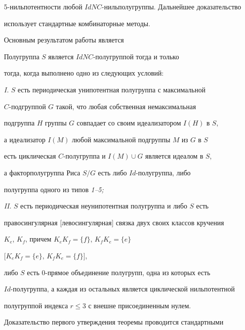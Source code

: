 5-нильпотентности любой $IdNC$-нильполугруппы. Дальнейшее доказательство


использует стандартные комбинаторные методы.





Основным результатом работы является





\begin{thmnonum} Полугруппа $S$ является $IdNC$-полугруппой тогда и только


тогда, когда выполнено одно из следующих условий$:$





{\em I.} $S$ есть периодическая унипотентная полугруппа с максимальной


$C$-подгруппой $G$ такой, что любая собственная немаксимальная


подгруппа $H$ группы $G$ совпадает со своим идеализатором $I(H)$ в $S$,


а идеализатор $I(M)$ любой максимальной подгруппы $M$ из $G$ в $S$


есть циклическая $C$-полугруппа и $I(M)\cup G$ является идеалом в $S$,


а факторполугруппа Риса $S/G$ есть либо $Id$-полугруппа, либо


полугруппа одного из типов {\em 1--5;}





{\em II.} $S$ есть периодическая неунипотентная полугруппа и либо $S$ есть


правосингулярная $[$левосингулярная$]$ связка двух своих классов кручения


$K_e$, $K_f$, причем $K_eK_f=\{f\}$, $K_fK_e=\{e\}$


$[K_eK_f=\{e\}$, $K_fK_e=\{f\}]$,


либо $S$ есть $0$-прямое объединение полугрупп, одна из которых есть


$Id$-полугруппа, а каждая из остальных является циклической нильпотентной


полугруппой индекса $r\le 3$ с внешне присоединенным нулем.


\end{thmnonum}





Доказательство первого утверждения теоремы проводится стандартными



